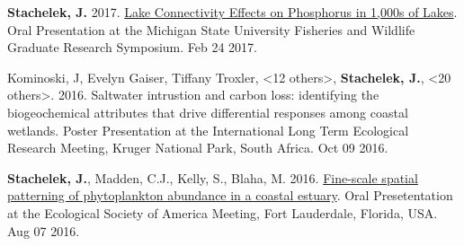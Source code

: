 \documentclass[11pt]{article}
\makeatletter
\newlength{\bibhang}
\newlength{\bibsep}
 {\@listi \global\bibsep\itemsep \global\advance\bibsep by\parsep}
\newenvironment{bibenum*}
  {\renewcommand\labelenumi{[\theenumi]}%
   \etaremune[
     topsep=0pt,
     itemsep=\bibsep,
     parsep=0pt,partopsep=0pt,
     itemindent=-\bibhang,
     leftmargin={\bibhang+\widthof{[999]}}]}
  {\endetaremune}
\makeatother
\begin{document}
\begin{bibenum*}
  \item \textbf{Stachelek, J.} 2017. \href{https://doi.org/10.6084/m9.figshare.8187038.v1}{Lake Connectivity Effects on Phosphorus in 1,000s of Lakes}. Oral Presentation at the Michigan State University Fisheries and Wildlife Graduate Research Symposium. Feb 24 2017.

  \item Kominoski, J, Evelyn Gaiser, Tiffany Troxler, <12 others>, \textbf{Stachelek, J.}, <20 others>. 2016. Saltwater intrustion and carbon loss: identifying the biogeochemical attributes that drive differential responses among coastal wetlands. Poster Presentation at the International Long Term Ecological Research Meeting, Kruger National Park, South Africa. Oct 09 2016.

  \item \textbf{Stachelek, J.}, Madden, C.J., Kelly, S., Blaha, M. 2016. \href{https://doi.org/10.6084/m9.figshare.2775322.v4}{Fine-scale spatial patterning of phytoplankton abundance in a coastal estuary}. Oral Presetentation at the Ecological Society of America Meeting, Fort Lauderdale, Florida, USA. Aug 07 2016. 
  

\end{bibenum*}
\end{document}
